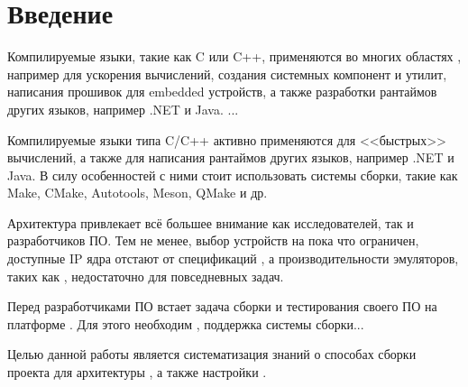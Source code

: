 
\section*{Введение}
\thispagestyle{withCompileDate}



Компилируемые языки, такие как \textsc{C} или \textsc{C++}, применяются во многих областях , например для ускорения вычислений, создания системных компонент и утилит, написания прошивок  для embedded  устройств, а также разработки рантаймов других языков, например .NET и Java.
...


Компилируемые языки типа C/C++ активно применяются для <<быстрых>> вычислений, а также для написания рантаймов других языков, например .NET и Java.
В силу особенностей  с ними стоит использовать системы сборки, такие как Make, CMake, Autotools, Meson, QMake и др.

Архитектура \riscv{} привлекает всё большее внимание как исследователей, так и разработчиков ПО.
Тем не менее, выбор устройств на \riscv{} пока что ограничен, доступные IP ядра отстают от спецификаций , а производительности эмуляторов, таких как \qemu{}, недостаточно для повседневных задач.

Перед разработчиками ПО встает задача сборки и тестирования своего ПО на платформе \riscv{}.
Для этого необходим \ci{}, поддержка системы сборки...

Целью данной работы является систематизация знаний о способах сборки проекта для архитектуры \riscv{}, а также настройки \ci{}.
